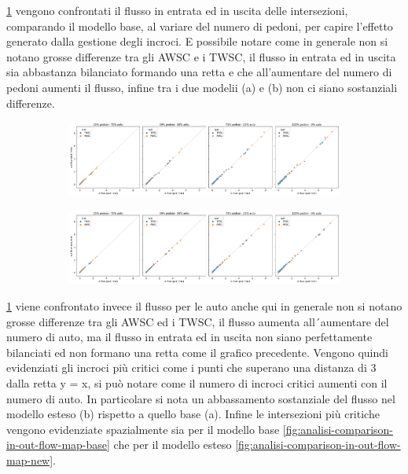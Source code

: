 \ref*{fig:analisi-comparison-in-out-flow-ped} vengono confrontati il flusso in entrata ed in uscita delle intersezioni,
comparando il modello base, al variare del numero di pedoni, per capire l'effetto generato dalla gestione degli incroci.
E possibile notare come in generale non si notano grosse differenze tra gli AWSC e i TWSC, 
il flusso in entrata ed in uscita sia abbastanza bilanciato formando una retta e che all'aumentare
del numero di pedoni aumenti il flusso, infine tra i due modelii (a) e (b) non ci siano sostanziali differenze.

\begin{figure}[ht]
    \centering
    \begin{subfigure}{0.99\textwidth}
        \centering
        \includegraphics[width=\textwidth]{images/analisi/comparison-base-in-out-flow-ped.png}
        \caption{}
    \end{subfigure}
    \begin{subfigure}{0.99\textwidth}
        \centering
        \includegraphics[width=\textwidth]{images/analisi/comparison-new-in-out-flow-ped.png}
        \caption{}
    \end{subfigure}
    \caption{}
    \label{fig:analisi-comparison-in-out-flow-ped}
\end{figure}

\ref*{fig:analisi-comparison-in-out-flow-ped} viene confrontato invece il flusso per le auto anche
qui in generale non si notano grosse differenze tra gli AWSC ed i TWSC, il flusso aumenta all´aumentare del numero di auto,
ma il flusso in entrata ed in uscita non siano perfettamente bilanciati ed non
formano una retta come il grafico precedente.
Vengono quindi evidenziati gli incroci più critici come i punti che superano una distanza di 3 dalla retta y = x,
si può notare come il numero di incroci critici aumenti con il numero di auto.
In particolare si nota un abbassamento sostanziale del flusso nel modello esteso (b)
rispetto a quello base (a).
Infine le intersezioni più critiche vengono evidenziate spazialmente sia per il modello base 
\ref*{fig:analisi-comparison-in-out-flow-map-base} che per il modello esteso \ref*{fig:analisi-comparison-in-out-flow-map-new}.

